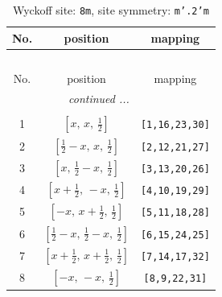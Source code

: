 \documentclass[fleqn,8pt]{jsarticle}
\begin{document}
\begin{longtable}{ccc}
\caption{Wyckoff site: {\tt 8m}, site symmetry: {\tt m'.2'm}}
 \\
 \hline \hline
No. & position & mapping \\ \hline \endfirsthead

\multicolumn{2}{l}{\tablename\ \thetable{}} \\
 \hline \hline
No. & position & mapping \\ \hline \endhead

 \hline \hline
\multicolumn{2}{r}{\footnotesize\it continued ...} \\ \endfoot

 \hline \hline
\multicolumn{2}{r}{} \\ \endlastfoot

1 & $\left[ x,\, x,\, \frac{1}{2} \right]$ & {\tt [1,16,23,30]} \\ \hline
2 & $\left[ \frac{1}{2} - x,\, x,\, \frac{1}{2} \right]$ & {\tt [2,12,21,27]} \\ \hline
3 & $\left[ x,\, \frac{1}{2} - x,\, \frac{1}{2} \right]$ & {\tt [3,13,20,26]} \\ \hline
4 & $\left[ x + \frac{1}{2},\, - x,\, \frac{1}{2} \right]$ & {\tt [4,10,19,29]} \\ \hline
5 & $\left[ - x,\, x + \frac{1}{2},\, \frac{1}{2} \right]$ & {\tt [5,11,18,28]} \\ \hline
6 & $\left[ \frac{1}{2} - x,\, \frac{1}{2} - x,\, \frac{1}{2} \right]$ & {\tt [6,15,24,25]} \\ \hline
7 & $\left[ x + \frac{1}{2},\, x + \frac{1}{2},\, \frac{1}{2} \right]$ & {\tt [7,14,17,32]} \\ \hline
8 & $\left[ - x,\, - x,\, \frac{1}{2} \right]$ & {\tt [8,9,22,31]} \\
\end{longtable}
\renewcommand{\arraystretch}{1.2}
\end{document}
